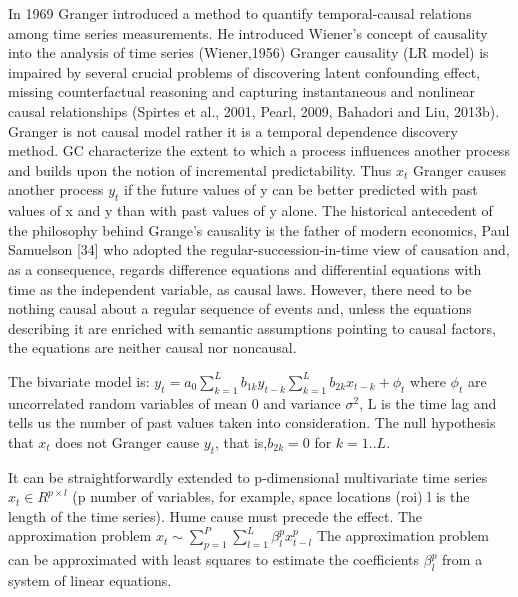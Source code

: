 \documentclass[onecollarge,runningheads]{svjour2}
\begin{document}
In 1969 Granger introduced a method to quantify temporal-causal relations among time series measurements. He introduced Wiener’s concept of causality into the analysis of time series (Wiener,1956)
Granger causality (LR model) is impaired by several crucial problems of discovering latent confounding effect, missing counterfactual reasoning and capturing instantaneous and nonlinear causal relationships (Spirtes et al., 2001, Pearl, 2009, Bahadori and Liu, 2013b).
Granger is not causal model rather it is a temporal dependence discovery method.
GC characterize the extent to which a process influences another process and builds upon the notion of incremental predictability. Thus $x_t$ Granger causes another process $y_t$ if the future values of y can be better predicted with past values of x and y than with past values of y alone.
The historical antecedent of the philosophy behind Grange's causality is the father of modern economics, Paul Samuelson [34] who adopted the regular-succession-in-time view of causation  and, as a consequence, regards difference equations and differential equations with time as the independent variable, as causal laws. 
However, there need to be nothing causal about a regular sequence of events and, unless the equations describing it are enriched with semantic assumptions pointing to causal factors, the equations are neither causal nor noncausal. 


The bivariate model is:
$y_t = a_0 \sum_{k=1}^{L}b_{1k}y_{t-k} \sum_{k=1}^{L}b_{2k}x_{t-k} + \phi_t$
where $\phi_t$ are uncorrelated random  variables of mean 0 and variance $\sigma^2$, L is the time lag and tells us the number of past values taken into consideration. The null hypothesis that $x_t$ does not Granger cause $y_t$, that is,$b_{2k} = 0$ for $k=1..L$.

It can be straightforwardly extended to p-dimensional multivariate time series $x_t \in R^{p \times l }$ (p number of variables, for example, space locations (roi) l is the length of the time series).
Hume cause must precede the effect.
The approximation problem
$x_t \sim \sum_{p=1}^{P} \sum_{l=1}^{L}\beta_{l}^{p} x_{t-l}^{p}$
The approximation problem can be approximated with least squares to estimate the coefficients $\beta_{l}^{p}$ from a system of linear equations.
\end{document}

